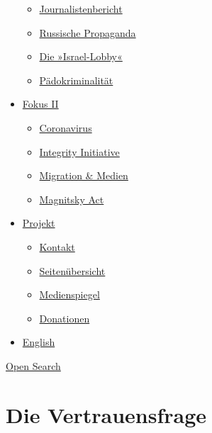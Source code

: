 \begin{itemize}
  \begin{itemize}
  \tightlist
  \item
    \href{https://swprs.org/bericht-eines-journalisten/}{Journalistenbericht}
  \item
    \href{https://swprs.org/russische-propaganda/}{Russische Propaganda}
  \item
    \href{https://swprs.org/die-israel-lobby-fakten-und-mythen/}{Die
    »Israel-Lobby«}
  \item
    \href{https://swprs.org/geopolitik-und-paedokriminalitaet/}{Pädokriminalität}
  \end{itemize}
\item
  \href{https://swprs.org/migration-und-medien/}{Fokus II}

  \begin{itemize}
  \tightlist
  \item
    \href{https://swprs.org/covid-19-hinweis-ii/}{Coronavirus}
  \item
    \href{https://swprs.org/die-integrity-initiative/}{Integrity
    Initiative}
  \item
    \href{https://swprs.org/migration-und-medien/}{Migration \& Medien}
  \item
    \href{https://swprs.org/der-fall-magnitsky/}{Magnitsky Act}
  \end{itemize}
\item
  \href{https://swprs.org/kontakt/}{Projekt}

  \begin{itemize}
  \tightlist
  \item
    \href{https://swprs.org/kontakt/}{Kontakt}
  \item
    \href{https://swprs.org/uebersicht/}{Seitenübersicht}
  \item
    \href{https://swprs.org/medienspiegel/}{Medienspiegel}
  \item
    \href{https://swprs.org/donationen/}{Donationen}
  \end{itemize}
\item
  \href{https://swprs.org/contact/}{English}
\end{itemize}

\protect\hyperlink{}{Open Search}

\hypertarget{die-vertrauensfrage}{%
\section{Die Vertrauensfrage}\label{die-vertrauensfrage}}

